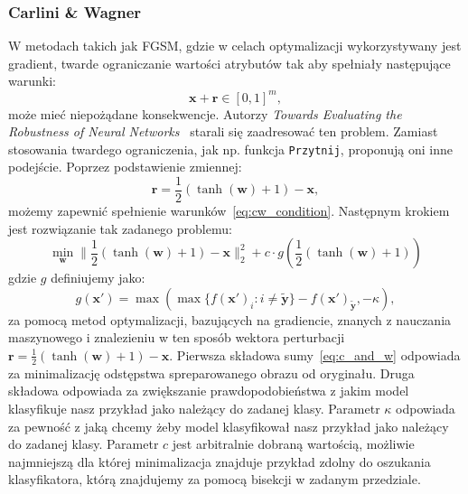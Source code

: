 \documentclass[
    left=2.5cm,         %
    right=2.5cm,        %
    top=2.5cm,          %
    bottom=3cm,         %
    bindingoffset=6mm,  %
    nohyphenation=false %
]{eiti/eiti-thesis}
\renewcommand{\vec}[1]{\mathbf{#1}}
\newcommand{\function}[1]{\texttt{#1}}
\begin{document}
\subsubsection{Carlini \& Wagner}
W metodach takich jak FGSM, gdzie w celach optymalizacji wykorzystywany jest gradient, twarde ograniczanie wartości atrybutów
tak aby spełniały następujące warunki:
\begin{equation}\label{eq:cw_condition}
    \vec{x}+\vec{r} \in [0,1]^m,
\end{equation}
może mieć niepożądane konsekwencje.
Autorzy \textit{Towards Evaluating the Robustness of Neural Networks}~\cite{DBLP:journals/corr/CarliniW16a} starali się zaadresować ten problem.
Zamiast stosowania twardego ograniczenia, jak np. funkcja \function{Przytnij}, proponują oni inne podejście.
Poprzez podstawienie zmiennej:
\begin{equation}
    \vec{r} = \frac{1}{2}(\tanh(\vec{w})+1) - \vec{x},
\end{equation}
możemy zapewnić spełnienie warunków~\eqref{eq:cw_condition}.
Następnym krokiem jest rozwiązanie tak zadanego problemu:
\begin{equation}\label{eq:c_and_w}
\min_{\vec{w}}\| \frac { 1 } { 2 } ( \tanh ( \vec{w} ) + 1 ) - \vec{x} \| _ { 2 } ^ { 2 } + c \cdot g ( \frac { 1 } { 2 } ( \tanh ( \vec{w} ) + 1 ) )
\end{equation}
gdzie $g$ definiujemy jako:
\begin{equation}
    g ( \vec{x'} ) = \max ( \max \{ f ( \vec{x'} ) _ { i } : i \neq \vec{\widetilde{y}} \} - f ( \vec{x'} ) _ { \vec{\widetilde{y}} } , - \kappa),
\end{equation}
za pomocą metod optymalizacji, bazujących na gradiencie, znanych z nauczania maszynowego i znalezieniu w ten sposób wektora
perturbacji $\vec{r} = \frac{1}{2}(\tanh(\vec{w})+1) - \vec{x}$.
Pierwsza składowa sumy~\eqref{eq:c_and_w} odpowiada za minimalizację odstępstwa spreparowanego obrazu
od oryginału. Druga składowa odpowiada za zwiększanie prawdopodobieństwa z jakim model klasyfikuje nasz przykład
jako należący do zadanej klasy. Parametr \(\kappa\) odpowiada za pewność z jaką chcemy żeby model klasyfikował nasz
przykład jako należący do zadanej klasy.
Parametr \(c\) jest arbitralnie dobraną wartością, możliwie najmniejszą dla której minimalizacja znajduje przykład zdolny do oszukania klasyfikatora, którą znajdujemy
za pomocą bisekcji w zadanym przedziale.

\end{document}
